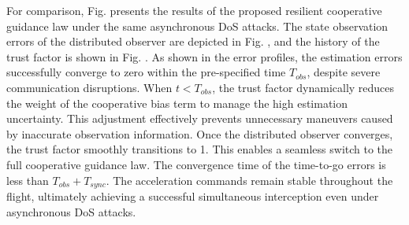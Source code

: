 \documentclass[lettersize,journal]{IEEEtran}
\begin{document}
For comparison, Fig. presents the results of the proposed resilient cooperative guidance law under the same asynchronous DoS attacks. The state observation errors of the distributed observer are depicted in Fig. , and the history of the trust factor is shown in Fig. . As shown in the error profiles, the estimation errors successfully converge to zero within the pre-specified time $T_{obs}$, despite severe communication disruptions. When $t < T_{obs}$, the trust factor dynamically reduces the weight of the cooperative bias term to manage the high estimation uncertainty. This adjustment effectively prevents unnecessary maneuvers caused by inaccurate observation information. Once the distributed observer converges, the trust factor smoothly transitions to 1. This enables a seamless switch to the full cooperative guidance law. The convergence time of the time-to-go errors is less than $T_{obs} + T_{sync}$. The acceleration commands remain stable throughout the flight, ultimately achieving a successful simultaneous interception even under asynchronous DoS attacks.

%
%
%
%
\end{document}
